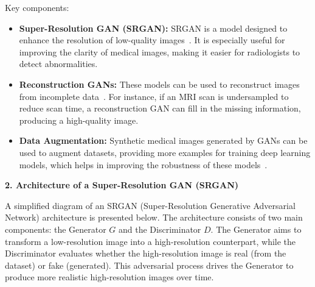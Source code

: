 Key components:
\begin{itemize}
    \item \textbf{Super-Resolution GAN (SRGAN):} SRGAN is a model designed to enhance the resolution of low-quality images~\cite{you2019ct}. It is especially useful for improving the clarity of medical images, making it easier for radiologists to detect abnormalities.
    \item \textbf{Reconstruction GANs:} These models can be used to reconstruct images from incomplete data~\cite{pan20202d}. For instance, if an MRI scan is undersampled to reduce scan time, a reconstruction GAN can fill in the missing information, producing a high-quality image.
    \item \textbf{Data Augmentation:} Synthetic medical images generated by GANs can be used to augment datasets, providing more examples for training deep learning models, which helps in improving the robustness of these models~\cite{wang2018esrgan}.
\end{itemize}

\textbf{2. Architecture of a Super-Resolution GAN (SRGAN)}

A simplified diagram of an SRGAN (Super-Resolution Generative Adversarial Network) architecture is presented below. The architecture consists of two main components: the Generator $G$ and the Discriminator $D$. The Generator aims to transform a low-resolution image into a high-resolution counterpart, while the Discriminator evaluates whether the high-resolution image is real (from the dataset) or fake (generated). This adversarial process drives the Generator to produce more realistic high-resolution images over time.

\begin{center}
\end{center}

